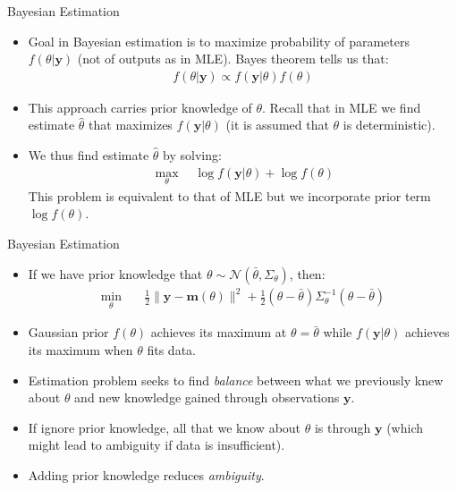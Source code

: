 \documentclass[handout,9pt]{beamer}
\begin{document}
%
\begin{frame}{Bayesian Estimation}

\begin{itemize}
\setlength{\itemsep}{10pt}
\item Goal in Bayesian estimation is to maximize probability of parameters $f(\theta|\mathbf{y})$ (not of outputs as in MLE). Bayes theorem tells us that:
\begin{align*}
f(\theta|\mathbf{y})\propto f(\mathbf{y}|\theta)f(\theta)
\end{align*}
\item This approach carries prior knowledge of $\theta$.  Recall that in MLE we find estimate $\hat{\theta}$ that maximizes $f(\mathbf{y}|\theta)$ (it is assumed that $\theta$ is deterministic). 

\item We thus find estimate $\hat{\theta}$ by solving:
\begin{align*}
\max_\theta\quad  \log f(\mathbf{y}|\theta)+\log f(\theta)
\end{align*}
This problem is equivalent to that of MLE but we incorporate prior term $\log f(\theta)$. 
\end{itemize}

\end{frame}

%
\begin{frame}{Bayesian Estimation}

\begin{itemize}
\setlength{\itemsep}{10pt}
\item If we have prior knowledge that $\theta\sim \mathcal{N}(\bar{\theta},\Sigma_\theta)$, then: 
\begin{align*}
\min_{\theta}& \quad \frac{1}{2}\|\mathbf{y}- \mathbf{m}(\theta)\|^2+\frac{1}{2}(\theta-\bar{\theta})\Sigma_\theta^{-1}(\theta-\bar{\theta})  
\end{align*}
\item Gaussian prior $f(\theta)$ achieves its maximum at $\theta=\bar{\theta}$ while $f(\mathbf{y}|\theta)$ achieves its maximum when $\theta$ fits data. 
\item Estimation problem seeks to find {\em balance} between what we previously knew about $\theta$ and new knowledge gained through observations $\mathbf{y}$. 
\item If ignore prior knowledge, all that we know about $\theta$ is through $\mathbf{y}$ (which might lead to ambiguity if data is insufficient). 
\item Adding prior knowledge reduces {\em ambiguity}. 
\end{itemize}

\end{frame}
\end{document}
